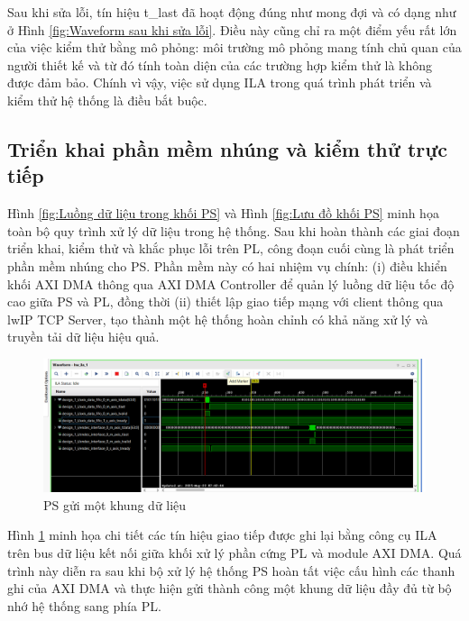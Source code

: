 \documentclass[../DoAn.tex]{subfiles}
\begin{document}
Sau khi sửa lỗi, tín hiệu t\_last đã hoạt động đúng như mong đợi và có dạng như ở Hình \ref{fig:Waveform sau khi sửa lỗi}. Điều này cũng chỉ ra một điểm yếu rất lớn của việc kiểm thử bằng mô phỏng: môi trường mô phỏng mang tính chủ quan của người thiết kế và từ đó tính toàn diện của các trường hợp kiểm thử là không được đảm bảo. Chính vì vậy, việc sử dụng ILA trong quá trình phát triển và kiểm thử hệ thống là điều bắt buộc.

\subsection{Triển khai phần mềm nhúng và kiểm thử trực tiếp}
\label{subsection:Triển khai phần mềm nhúng và kiểm thử trực tiếp}

Hình \ref{fig:Luồng dữ liệu trong khối PS} và Hình \ref{fig:Lưu đồ khối PS} minh họa toàn bộ quy trình xử lý dữ liệu trong hệ thống. Sau khi hoàn thành các giai đoạn triển khai, kiểm thử và khắc phục lỗi trên PL, công đoạn cuối cùng là phát triển phần mềm nhúng cho PS. Phần mềm này có hai nhiệm vụ chính: (i) điều khiển khối AXI DMA thông qua AXI DMA Controller để quản lý luồng dữ liệu tốc độ cao giữa PS và PL, đồng thời (ii) thiết lập giao tiếp mạng với client thông qua lwIP TCP Server, tạo thành một hệ thống hoàn chỉnh có khả năng xử lý và truyền tải dữ liệu hiệu quả.

\begin{figure}[H]
    \centering
    \includegraphics[width=\textwidth, height=0.33\textheight, keepaspectratio]{Hinhve/Chuong 4/ILA transfer.png}
    \caption{PS gửi một khung dữ liệu}
    \label{fig:PS gửi một khung dữ liệu}
\end{figure}

Hình \ref{fig:PS gửi một khung dữ liệu} minh họa chi tiết các tín hiệu giao tiếp được ghi lại bằng công cụ ILA trên bus dữ liệu kết nối giữa khối xử lý phần cứng PL và module AXI DMA. Quá trình này diễn ra sau khi bộ xử lý hệ thống PS hoàn tất việc cấu hình các thanh ghi của AXI DMA và thực hiện gửi thành công một khung dữ liệu đầy đủ từ bộ nhớ hệ thống sang phía PL. 
\end{document}
